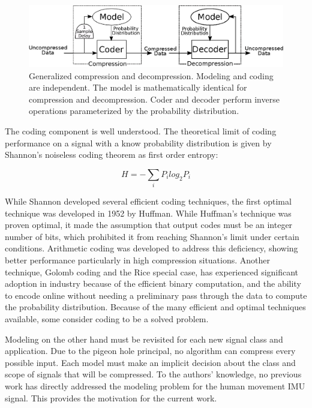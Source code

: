 \documentclass[journal]{IEEEtran}
\begin{document}
\begin{figure}
  \includegraphics[width=\linewidth]{general_compressor4.eps}
  \caption{Generalized compression and decompression. Modeling and coding are independent. The model is mathematically identical for compression and decompression. Coder and decoder perform inverse operations parameterized by the probability distribution.}
  \label{fig:general_compressor}
\end{figure}

The coding component is well understood. The theoretical limit of coding performance on a signal with a know probability distribution is given by Shannon's noiseless coding theorem\cite{Shannon1948} as first order entropy:

$$H = -\sum_{i} P_ilog_2P_i$$

While Shannon developed several efficient coding techniques, the first optimal technique was developed in 1952 by Huffman\cite{Huffman1952}. While Huffman's technique was proven optimal, it made the assumption that output codes must be an integer number of bits, which prohibited it from reaching Shannon's limit under certain conditions. Arithmetic coding was developed to address this deficiency, showing better performance particularly in high compression situations\cite{Witten1987}. Another technique, Golomb coding and the Rice special case, has experienced significant adoption in industry because of the efficient binary computation, and the ability to encode online without needing a preliminary pass through the data to compute the probability distribution\cite{Golomb1966}\cite{F.Rice1979}. Because of the many efficient and optimal techniques available, some consider coding to be a solved problem\cite{Mahoney2013}.

Modeling on the other hand must be revisited for each new signal class and application. Due to the pigeon hole principal, no algorithm can compress every possible input\cite{Kolmogorov1965}. Each model must make an implicit decision about the class and scope of signals that will be compressed. To the authors' knowledge, no previous work has directly addressed the modeling problem for the human movement IMU signal. This provides the motivation for the current work.
\end{document}
